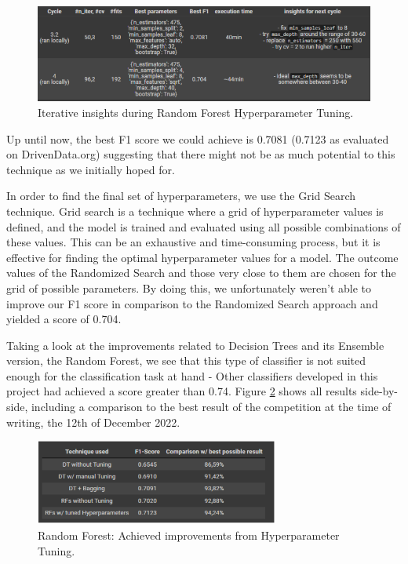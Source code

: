 \begin{figure}[h!]
	\centering
            \includegraphics[width=120mm]{images/rf_figure_01.png}
	\caption{Iterative insights during Random Forest Hyperparameter Tuning.}
	\label{PICTURE_figure_rf_01}
\end{figure}

Up until now, the best F1 score we could achieve is 0.7081 (0.7123 as evaluated on DrivenData.org) suggesting that there might not be as much potential to this technique as we initially hoped for. 

In order to find the final set of hyperparameters, we use the Grid Search technique. Grid search is a technique where a grid of hyperparameter values is defined, and the model is trained and evaluated using all possible combinations of these values. This can be an exhaustive and time-consuming process, but it is effective for finding the optimal hyperparameter values for a model. The outcome values of the Randomized Search and those very close to them are chosen for the grid of possible parameters. By doing this, we unfortunately weren’t able to improve our F1 score in comparison to the Randomized Search approach and yielded a score of 0.704.

Taking a look at the improvements related to Decision Trees and its Ensemble version, the Random Forest, we see that this type of classifier is not suited enough for the classification task at hand - Other classifiers developed in this project had achieved a score greater than 0.74. Figure \ref{PICTURE_figure_rf_02} shows all results side-by-side, including a comparison to the best result of the competition at the time of writing, the 12th of December 2022.

\begin{figure}[h!]
	\centering
            \includegraphics[width=80mm]{images/rf_figure_02.png}
	\caption{Random Forest: Achieved improvements from Hyperparameter Tuning.}
	\label{PICTURE_figure_rf_02}
\end{figure}


